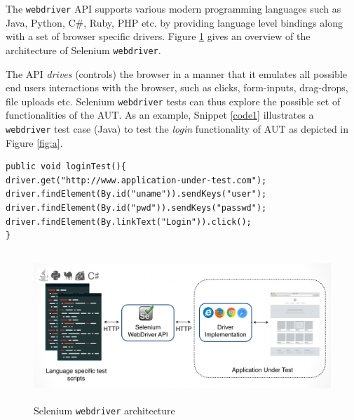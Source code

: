 The \texttt{webdriver} API supports various modern programming languages such as Java, Python, C\#, Ruby, PHP etc. by providing language level bindings along with a set of browser specific drivers. Figure \ref{fig:webdriverArchitecture} gives an overview of the architecture of Selenium \texttt{webdriver}.

The API \textit{drives} (controls) the browser in a manner that it emulates all possible end users interactions with the browser, such as clicks, form-inputs, drag-drops, file uploads etc. Selenium \texttt{webdriver} tests can thus explore the possible set of functionalities of the AUT. As an example, Snippet \ref{code1} illustrates a \texttt{webdriver} test case (Java) to test the \textit{login} functionality of AUT as depicted in Figure \ref{fig:a}.
\begin{center}
\begin{scriptsize}
\centering
\lstset{
  basicstyle=\ttfamily,
  columns=fullflexible,
  keepspaces=true,
}
  
\begin{lstlisting}[caption=Login test,label=code1]
public void loginTest(){
driver.get("http://www.application-under-test.com");
driver.findElement(By.id("uname")).sendKeys("user");
driver.findElement(By.id("pwd")).sendKeys("passwd");
driver.findElement(By.linkText("Login")).click();
}
\end{lstlisting}
\end{scriptsize} 
\end{center}
 
\begin{figure}[h! ]
\makeatletter 
\makeatother
    \centering
  \includegraphics[width=5.5in,height=2.2in]{./Figures/webdriver_Archi}
  \caption{Selenium \texttt{webdriver} architecture}
  \label{fig:webdriverArchitecture} 
\end{figure}

